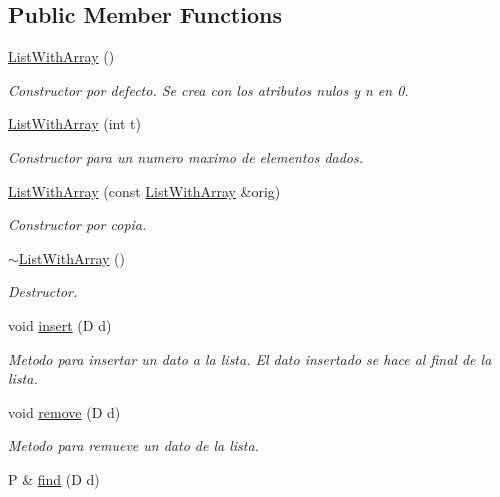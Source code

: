 \subsection*{Public Member Functions}
\begin{DoxyCompactItemize}
\item 
\hyperlink{classListWithArray_a06f0e8035e9cc43aff4d32c46a00fcf0}{List\+With\+Array} ()
\begin{DoxyCompactList}\small\item\em Constructor por defecto. Se crea con los atributos nulos y n en 0. \end{DoxyCompactList}\item 
\hyperlink{classListWithArray_a3a6d11f203fb0f7e458672e85db26b03}{List\+With\+Array} (int t)
\begin{DoxyCompactList}\small\item\em Constructor para un numero maximo de elementos dados. \end{DoxyCompactList}\item 
\hyperlink{classListWithArray_a760ab3b39abb104e76a1fdbd2d303cc2}{List\+With\+Array} (const \hyperlink{classListWithArray}{List\+With\+Array} \&orig)
\begin{DoxyCompactList}\small\item\em Constructor por copia. \end{DoxyCompactList}\item 
\hyperlink{classListWithArray_a1886482555430b0f3eb5ebe02cbb0c87}{$\sim$\+List\+With\+Array} ()
\begin{DoxyCompactList}\small\item\em Destructor. \end{DoxyCompactList}\item 
void \hyperlink{classListWithArray_afa0b6d215c2cc1d3fe6b9b48d6b6917d}{insert} (D d)
\begin{DoxyCompactList}\small\item\em Metodo para insertar un dato a la lista. El dato insertado se hace al final de la lista. \end{DoxyCompactList}\item 
void \hyperlink{classListWithArray_aaa18e76fc128ca05151178d914901ec3}{remove} (D d)
\begin{DoxyCompactList}\small\item\em Metodo para remueve un dato de la lista. \end{DoxyCompactList}\item 
P \& \hyperlink{classListWithArray_a83d6be27dd1ace1e409df0ba000c9f39}{find} (D d)

\end{DoxyCompactItemize}
